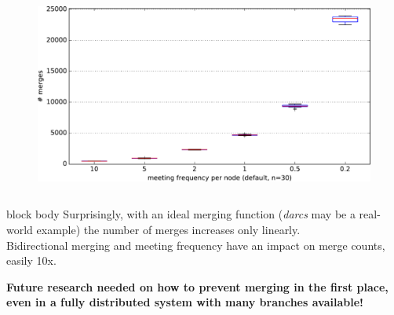 \documentclass[final,hyperref={pdfpagelabels=false}]{beamer}
\begin{document}
\begin{frame}
\begin{columns}
\begin{column}{.9\textwidth}
\begin{columns}
\begin{column}{.3\textwidth}
\begin{figure}
      \includegraphics[width=\linewidth]{fig/dumb_meeting_frequency_n=30.pdf}
    \end{figure}
  \end{column}

  \end{columns}

  \vspace{10mm}
  \begin{center}
  
  \end{center}


  \vspace{1mm}
  \begin{beamercolorbox}[leftskip=0.5em,rightskip=0.5em,colsep*=.75ex,sep=0.5ex,vmode]{block body}%
  \vspace{0.2em}
  Surprisingly, with an ideal merging function (\textit{darcs} may be a real-world example) the number of merges increases only linearly. \\
  Bidirectional merging and meeting frequency have an impact on merge counts, easily 10x. \\
  \vspace{0.2em}
  \end{beamercolorbox}

  \vspace{1.5cm}
  \begin{center}
  \textbf{Future research needed on how to prevent merging in the first place, even in a fully distributed system with many branches available!}
  \end{center}

\end{column}
\end{columns}
\end{frame}
\end{document}
